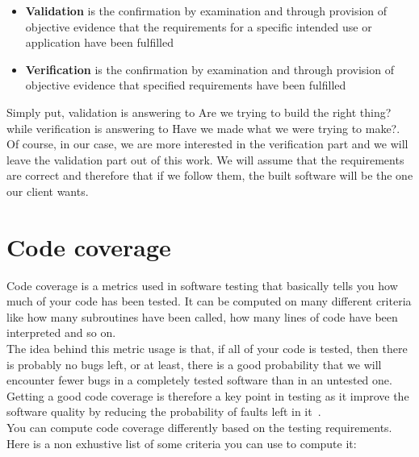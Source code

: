 \documentclass[12pt]{article}
\theoremstyle{definition}
\theoremstyle{definition}
\theoremstyle{remark}
\begin{document}
\begin{itemize}

\item \textbf{Validation} is the confirmation by examination and through provision of objective evidence that the requirements for a specific intended use or application have been fulfilled~\cite{IEEEStd1990}
\item \textbf{Verification} is the confirmation by examination and through provision of objective evidence that specified requirements have been fulfilled~\cite{IEEEStd1990}

\end{itemize}

Simply put, validation is answering to \guillemotleft Are we trying to build the right thing?\guillemotright while verification is answering to \guillemotleft Have we made what we were trying to make?\guillemotright. Of course, in our case, we are more interested in the verification part and we will leave the validation part out of this work. We will assume that the requirements are correct and therefore that if we follow them, the built software will be the one our client wants.



\section{Code coverage}


Code coverage is a metrics used in software testing that basically tells you how much of your code has been tested. It can be computed on many different criteria like how many subroutines have been called, how many lines of code have been interpreted and so on.\\

The idea behind this metric usage is that, if all of your code is tested, then there is probably no bugs left, or at least, there is a good probability that we will encounter fewer bugs in a completely tested software than in an untested one. Getting a good code coverage is therefore a key point in testing as it improve the software quality by reducing the probability of faults left in it~\cite{TestingForContinuousDelivery:2016}.\\

You can compute code coverage differently based on the testing requirements. Here is a non exhustive list of some criteria you can use to compute it:
\end{document}
